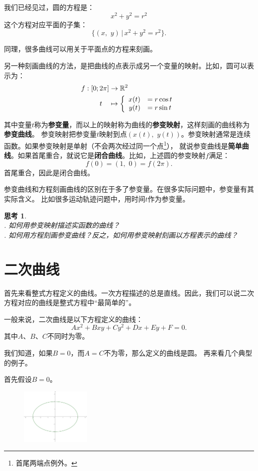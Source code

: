 \documentclass[12pt,UTF8]{ctexbook}
\theoremstyle{definition}
\theoremstyle{plain}
\newtheorem{sk}{思考}[section]
\begin{document}
我们已经见过，圆的方程是：
$$ x^2 + y^2 = r^2 $$
这个方程对应平面的子集：
$$ \{(x,\,\,y ) \, | \, x^2 + y^2 = r^2 \}.$$

同理，很多曲线可以用关于平面点的方程来刻画。

另一种刻画曲线的方法，是把曲线的点表示成另一个变量的映射。比如，圆可以表示为：
\begin{align*}
    f: [0;2\pi] &\rightarrow \mathbb{R}^2 \\
    t\quad &\mapsto\left\{
        \begin{array}[]{rl}
            x(t) &= r\cos{t} \\
            y(t) &= r\sin{t} \\
        \end{array}
    \right.
\end{align*}

其中变量$t$称为\textbf{参变量}，而以上的映射称为曲线的\textbf{参变映射}，这样刻画的曲线称为\textbf{参变曲线}。
参变映射把参变量$t$映射到点$(x(t),\,\, y(t))$。参变映射通常是连续函数。如果参变映射是单射（不会两次经过同一个点\footnote{首尾两端点例外。}），
就说参变曲线是\textbf{简单曲线}。如果首尾重合，就说它是\textbf{闭合曲线}。比如，上述圆的参变映射$f$满足：
$$ f(0) =  (1, \,\,0) = f(2\pi). $$
首尾重合，因此是闭合曲线。

参变曲线和方程刻画曲线的区别在于多了参变量。在很多实际问题中，参变量有其实际含义。
比如很多运动轨迹问题中，用时间$t$作为参变量。

\begin{sk}
    \mbox{} \\
    . 如何用参变映射描述实函数的曲线？\\
    . 如何用方程刻画参变曲线？反之，如何用参变映射刻画以方程表示的曲线？
\end{sk}

\section{二次曲线}

首先来看整式方程定义的曲线。一次方程描述的总是直线。因此，我们可以说二次方程对应的曲线是整式方程中“最简单的”。

一般来说，二次曲线是以下方程定义的曲线：
$$ Ax^2 + Bxy + Cy^2 + Dx + Ey + F = 0.$$
其中$A$、$B$、$C$不同时为零。

我们知道，如果$B = 0$，而$A = C$不为零，那么定义的曲线是圆。
再来看几个典型的例子。

首先假设$B = 0$。

\begin{figure} %
    \vspace{-30pt}
    \flushright
    \includegraphics[width=0.3\textwidth]{tu/椭圆1.png}
\end{figure}
\end{document}
